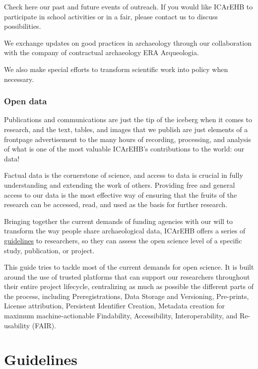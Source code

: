 \documentclass[
  letterpaper,
  DIV=11,
  numbers=noendperiod]{scrreprt}
\begin{document}
Check here our past and future events of outreach. If you would like
ICArEHB to participate in school activities or in a fair, please contact
us to discuss possibilities.

We exchange updates on good practices in archaeology through our
collaboration with the company of contractual archaeology ERA
Arqueologia.

We also make special efforts to transform scientific work into policy
when necessary.

\hypertarget{open-data}{%
\subsection*{Open data}\label{open-data}}

Publications and communications are just the tip of the iceberg when it
comes to research, and the text, tables, and images that we publish are
just elements of a frontpage advertisement to the many hours of
recording, processing, and analysis of what is one of the most valuable
ICArEHB's contributions to the world: our data!

Factual data is the cornerstone of science, and access to data is
crucial in fully understanding and extending the work of others.
Providing free and general access to our data is the most effective way
of ensuring that the fruits of the research can be accessed, read, and
used as the basis for further research.

Bringing together the current demands of funding agencies with our will
to transform the way people share archaeological data, ICArEHB offers a
series of \protect\hyperlink{guidelines}{guidelines} to researchers, so
they can assess the open science level of a specific study, publication,
or project.

This guide tries to tackle most of the current demands for open science.
It is built around the use of trusted platforms that can support our
researchers throughout their entire project lifecycle, centralizing as
much as possible the different parts of the process, including
Preregistrations, Data Storage and Versioning, Pre-prints, License
attribution, Persistent Identifier Creation, Metadata creation for
maximum machine-actionable Findability, Accessibility, Interoperability,
and Re-usability (FAIR).


\hypertarget{guidelines}{%
\chapter*{Guidelines}\label{guidelines}}
\end{document}
